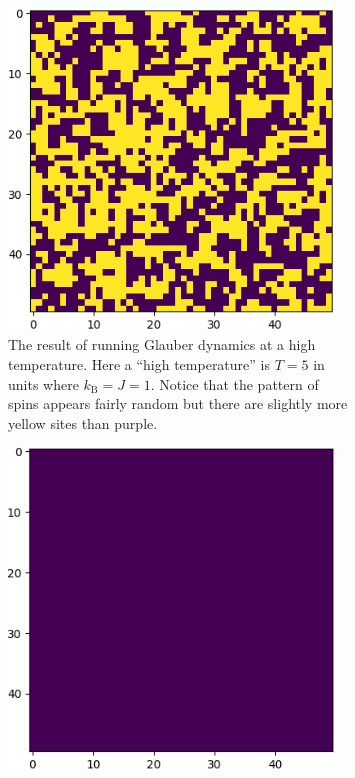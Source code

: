 \documentclass[fleqn]{NotesClass}
\newcommand*{\boltzmann}{k_{\mathrm{B}}}
\begin{document}
    \begin{figure}
        \begin{subfigure}[t]{0.45\textwidth}
            \includegraphics[width=0.95\textwidth]{images/ising-glauber-high-temp-result}
            \caption[The result of running Glauber dynamics at a high temperature.]{The result of running Glauber dynamics at a high temperature. Here a \enquote{high temperature} is \(T = 5\) in units where \(\boltzmann = J = 1\). Notice that the pattern of spins appears fairly random but there are slightly more yellow sites than purple.}
        \end{subfigure}
        \hspace{1em}
        \begin{subfigure}[t]{0.45\textwidth}
            \includegraphics[width=0.95\textwidth]{images/ising-glauber-low-temp-result}

\end{subfigure}
\end{figure}
\end{document}
